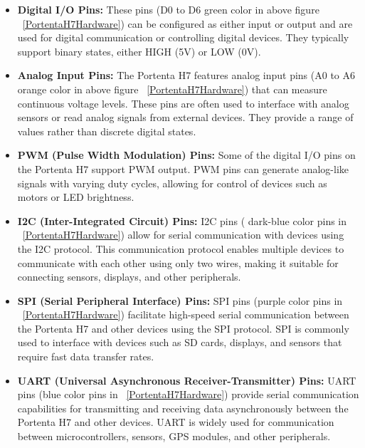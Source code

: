 \begin{enumerate}
	\begin{itemize}
		
		\item \textbf{Digital I/O Pins:} These pins (D0 to D6 green color in above figure ~\ref{PortentaH7Hardware}) can be configured as either input or output and are used for digital communication or controlling digital devices. They typically support binary states, either HIGH (5V) or LOW (0V).
		
		\item \textbf{Analog Input Pins:} The Portenta H7 features analog input pins (A0 to A6 orange color in above figure ~\ref{PortentaH7Hardware}) that can measure continuous voltage levels. These pins are often used to interface with analog sensors or read analog signals from external devices. They provide a range of values rather than discrete digital states.
		
		\item \textbf{PWM (Pulse Width Modulation) Pins:} Some of the digital I/O pins on the Portenta H7 support PWM output. PWM pins can generate analog-like signals with varying duty cycles, allowing for control of devices such as motors or LED brightness.
		
		\item \textbf{I2C (Inter-Integrated Circuit) Pins:} I2C pins ( dark-blue color pins in ~\ref{PortentaH7Hardware}) allow for serial communication with devices using the I2C protocol. This communication protocol enables multiple devices to communicate with each other using only two wires, making it suitable for connecting sensors, displays, and other peripherals.
		
		\item \textbf{SPI (Serial Peripheral Interface) Pins:} SPI pins (purple color pins in ~\ref{PortentaH7Hardware}) facilitate high-speed serial communication between the Portenta H7 and other devices using the SPI protocol. SPI is commonly used to interface with devices such as SD cards, displays, and sensors that require fast data transfer rates.
		
		\item \textbf{UART (Universal Asynchronous Receiver-Transmitter) Pins:} UART pins (blue color pins in ~\ref{PortentaH7Hardware}) provide serial communication capabilities for transmitting and receiving data asynchronously between the Portenta H7 and other devices. UART is widely used for communication between microcontrollers, sensors, GPS modules, and other peripherals.
		

\end{itemize}
\end{enumerate}
